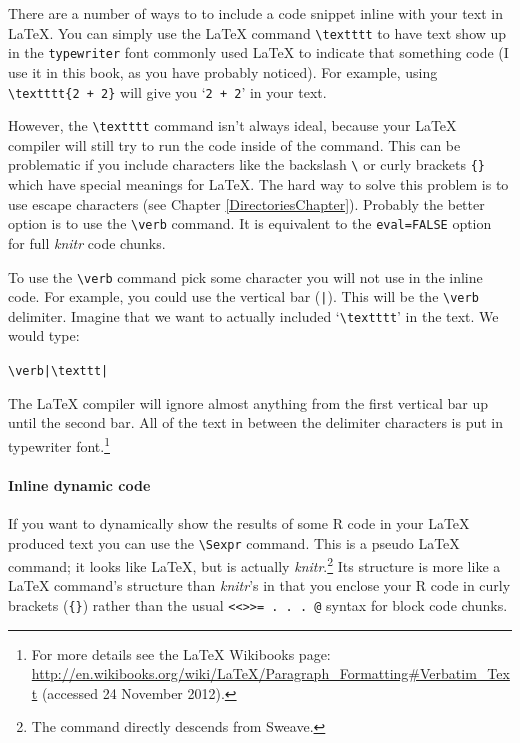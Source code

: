 There are a number of ways to to include a code snippet inline with your text in LaTeX. You can simply use the LaTeX command \verb|\textttt| to have text show up in the \texttt{typewriter} font commonly used LaTeX to indicate that something code (I use it in this book, as you have probably noticed). For example, using \verb|\textttt{2 + 2}| will give you `\texttt{2 + 2}' in your text.

However, the \verb|\textttt| command isn't always ideal, because your LaTeX compiler will still try to run the code inside of the command. This can be problematic if you include characters like the backslash \verb|\| or curly brackets \verb|{}| which have special meanings for LaTeX. The hard way to solve this problem is to use escape characters (see Chapter \ref{DirectoriesChapter}). Probably the better option is to use the \verb|\verb| command. It is equivalent to the \texttt{eval=FALSE} option for full {\emph{knitr}} code chunks. 

To use the \verb|\verb| command pick some character you will not use in the inline code. For example, you could use the vertical bar (\texttt{|}). This will be the \verb|\verb| delimiter. Imagine that we want to actually included `\verb|\textttt|' in the text. We would type:

\begin{knitrout}
\color{fgcolor}\begin{kframe}
\begin{alltt}
\textbackslash{}verb|\textbackslash{}texttt|
\end{alltt}
\end{kframe}
\end{knitrout}


\noindent The LaTeX compiler will ignore almost anything from the first vertical bar up until the second bar. All of the text in between the delimiter characters is put in typewriter font.\footnote{For more details see the LaTeX Wikibooks page: \url{http://en.wikibooks.org/wiki/LaTeX/Paragraph_Formatting#Verbatim_Text} (accessed 24 November 2012).}

\paragraph{Inline dynamic code}

If you want to dynamically show the results of some R code in your LaTeX produced text you can use the  \texttt{\textbackslash Sexpr} command. This is a pseudo LaTeX command; it looks like LaTeX, but is actually {\emph{knitr}}.\footnote{The command directly descends from Sweave.} Its structure is more like a LaTeX command's structure than {\emph{knitr}}'s in that you enclose your R code in curly brackets (\texttt{\{\}}) rather than the usual \verb|<<>>= . . . @| syntax for block code chunks. 

